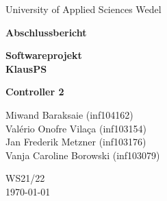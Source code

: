 
\begin{titlepage}
    \begin{center}
        \begin{large}
            University of Applied Sciences Wedel\\

        \end{large}
        \vspace{2cm}
        \begin{huge}
            \textbf{Abschlussbericht}\\
            \bigskip
            \begin{Huge}
                \textbf{Softwareprojekt}\\
                \vspace{0.5cm}
                \textbf{KlausPS}\\
                \vfill
            \end{Huge}
        \end{huge}
        \begin{Large}
            \textbf{Controller 2}\\
        \end{Large}
        \vspace{0.5cm}
        Miwand Baraksaie (inf104162)\\
        Valério Onofre Vilaça (inf103154)\\
        Jan Frederik Metzner (inf103176)\\
        Vanja Caroline Borowski (inf103079)\\
        \bigskip
        \begin{large}
            \vspace{4cm}
        \end{large}
        \bigskip
        WS21/22\\
        \today
        \vfill
    \end{center}
\end{titlepage}
